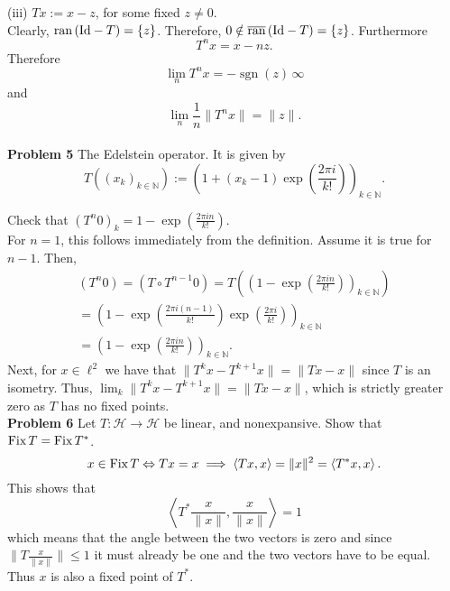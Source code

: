 \documentclass{scrartcl}
\newcommand{\N}{\mathbb{N}}
\renewcommand{\H}{\mathcal{H}}
\DeclareMathOperator{\sgn}{sgn}
\theoremstyle{plain}
\theoremstyle{remark}
\newcommand{\Id}{\textup{Id}}
\newcommand{\ran}{\textup{ran}\,}
\newcommand{\clran}{\overline{\textup{ran}}\,}
\newcommand{\Fix}{\textup{Fix}\,}
\begin{document}
(iii) $Tx := x - z$, for some fixed $z \neq 0$.\\
Clearly, $\ran(\Id - T)= \{z\}$.
Therefore, $0 \notin \clran(\Id - T) = \{z\}$.
Furthermore
\begin{equation}
  T^{n}x = x -nz.
\end{equation}
Therefore 
\begin{equation}
  \lim_n T^{n}x = -\sgn(z)\,\infty
\end{equation}
and
\begin{equation}
  \lim_n \frac{1}{n} \lVert T^{n}x \rVert = \lVert z \rVert.
\end{equation}\\


\textbf{Problem 5} The Edelstein operator.
It is given by 
\begin{equation}
  T\left({(x_{k})}_{k \in \N}\right) := {\left( 1 + (x_{k} - 1)\exp \left(\frac{2 \pi i}{k!}\right)\right)}_{k \in \N}.
\end{equation}

Check that ${(T^{n}0)}_{k} = 1 - \exp \left(\frac{2 \pi i n}{k!}\right)$.\\

For $n=1$, this follows immediately from the definition.
Assume it is true for $n-1$. Then,
\begin{equation}
  \begin{aligned}
    {(T^{n}0)} = {(T \circ T^{n-1}0)} = T \left( {\left(1 - \exp \left(\frac{2 \pi i n}{k!}\right)\right)}_{k \in \N} \right) \\
    = {\left( 1 - \exp\left(\frac{2 \pi i (n-1)}{k!}\right)\exp \left(\frac{2 \pi i}{k!}\right)\right)}_{k \in \N} \\
    = {\left( 1 - \exp \left(\frac{2 \pi i n }{k!}\right)\right)}_{k \in \N}.
  \end{aligned}
\end{equation}
Next, for $x \in \ell^2$ we have that $\lVert T^{k}x - T^{k+1}x \rVert = \lVert Tx - x \rVert$ since $T$ is an isometry.
Thus, $\lim_{k} \lVert T^{k}x - T^{k+1}x \rVert = \lVert Tx - x \rVert$, which is strictly greater zero as $T$ has no fixed points.\\


\textbf{Problem 6} Let $T: \H \to \H$ be linear, and nonexpansive. Show that $\Fix T = \Fix T^*$.
\begin{equation}
  x \in \Fix T \Leftrightarrow Tx=x \implies \left\langle Tx, x \right\rangle = \lVert x \rVert^2 = \left\langle T^*x, x \right\rangle.
\end{equation}
This shows that 
\begin{equation}
  \left\langle T^*\frac{x}{\lVert x \rVert}, \frac{x}{\lVert x \rVert} \right\rangle = 1
\end{equation}
which means that the angle between the two vectors is zero and since $\lVert T \frac{x}{\lVert x \rVert} \rVert \le 1$ it must already be one and the two vectors have to be equal. Thus $x$ is also a fixed point of $T^*$.\\
\end{document}
